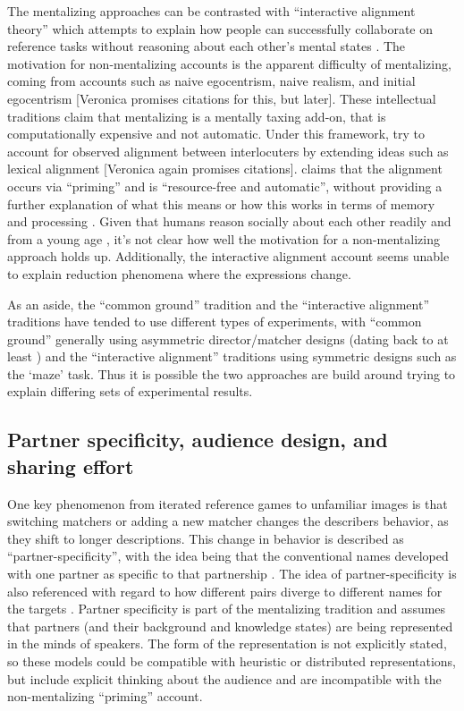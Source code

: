 \documentclass[]{article}
\begin{document}
The mentalizing approaches can be contrasted with ``interactive alignment theory'' which attempts to explain how people can successfully collaborate on reference tasks without reasoning about each other's mental states \citep{pickering2004, gandolfi2022}. The motivation for non-mentalizing accounts is the apparent difficulty of mentalizing, coming from accounts such as naive egocentrism, naive realism, and initial egocentrism [Veronica promises citations for this, but later].%
 These intellectual traditions claim that mentalizing is a mentally taxing add-on, that is computationally expensive and not automatic. Under this framework, \citep{pickering2004, gandolfi2022} try to account for observed alignment between interlocuters by extending ideas such as lexical alignment [Veronica again promises citations].%
   \citep{pickering2004} claims that the alignment occurs via ``priming'' and is ``resource-free and automatic'', without providing a further explanation of what this means or how this works in terms of memory and processing .  Given that humans reason socially about each other readily and from a young age \citep{rakoczy2022}, it's not clear how well the motivation for a non-mentalizing approach holds up. Additionally, the interactive alignment account seems unable to explain reduction phenomena where the expressions change. 

As an aside, the ``common ground'' tradition and the ``interactive alignment'' traditions have tended to use different types of experiments, with ``common ground'' generally using asymmetric director/matcher designs (dating back to at least \citet{krauss1966}) and the ``interactive alignment'' traditions using symmetric designs such as the `maze' task. Thus it is possible the two approaches are build around trying to explain differing sets of experimental results. 




\subsection{Partner specificity, audience design, and sharing effort}

One key phenomenon from iterated reference games to unfamiliar images is that switching matchers or adding a new matcher changes the describers behavior, as they shift to longer descriptions. This change in behavior is described as ``partner-specificity'', with the idea being that the conventional names developed with one partner as specific to that partnership \citep{brennan1996, metzing2003a, hawkins2021a}. The idea of partner-specificity is also referenced with regard to how different pairs diverge to different names for the targets \citep{hawkins2020b}. Partner specificity is part of the mentalizing tradition and assumes that partners (and their background and knowledge states) are being represented in the minds of speakers. The form of the representation is not explicitly stated, so these models could be compatible with heuristic or distributed representations, but include explicit thinking about the audience and are incompatible with the non-mentalizing ``priming'' account. 
\end{document}
